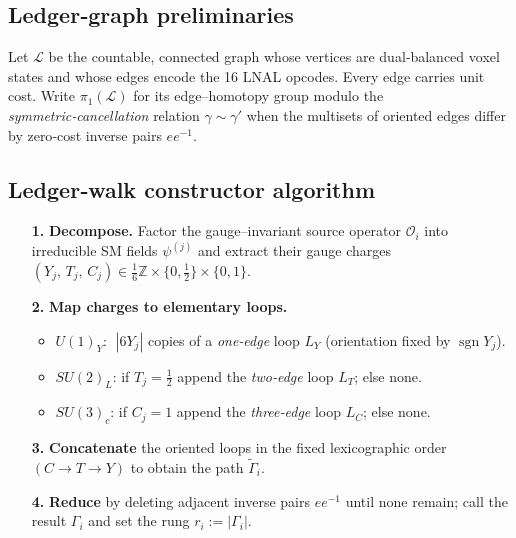 \subsection*{Ledger‑graph preliminaries}

Let $\mathscr L$ be the countable, connected graph whose
vertices are dual‑balanced voxel states and whose
edges encode the 16 LNAL opcodes.
Every edge carries unit cost.
Write $\pi_1(\mathscr L)$ for its edge–homotopy group
modulo the \emph{symmetric‑cancellation} relation
$\gamma\sim\gamma'$ when the multisets of oriented edges
differ by zero‑cost inverse pairs $ee^{-1}$.

\subsection*{Ledger‑walk constructor algorithm}

\begin{enumerate}
\item[\textbf{1.}]
  \textbf{Decompose.}  
  Factor the gauge–invariant source operator
  $\mathcal O_i$ into irreducible SM fields
  $\psi^{(j)}$ and extract their gauge charges  
  $(Y_j,\,T_j,\,C_j)\in
   \tfrac16\mathbb Z\times\{0,\tfrac12\}\times\{0,1\}$.
\item[\textbf{2.}]
  \textbf{Map charges to elementary loops.}
  \begin{itemize}
    \item $U(1)_Y$: $\;|6Y_j|$ copies of a \emph{one‑edge}
          loop $L_Y$ (orientation fixed by $\operatorname{sgn}Y_j$).
    \item $SU(2)_L$: if $T_j=\tfrac12$ append the
          \emph{two‑edge} loop $L_T$; else none.
    \item $SU(3)_c$: if $C_j=1$ append the
          \emph{three‑edge} loop $L_C$; else none.
  \end{itemize}
\item[\textbf{3.}]
  \textbf{Concatenate} the oriented loops in the fixed
  lexicographic order $(C\!\to\!T\!\to\!Y)$
  to obtain the path $\widetilde\Gamma_i$.
\item[\textbf{4.}]
  \textbf{Reduce} by deleting adjacent inverse pairs
  $ee^{-1}$ until none remain; call the result $\Gamma_i$
  and set the rung $r_i:=|\Gamma_i|$.
\end{enumerate}

